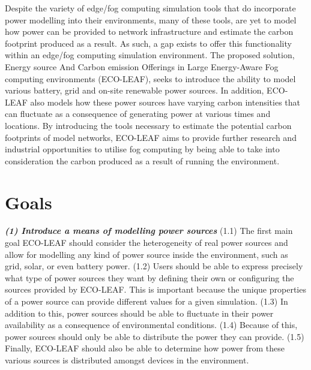 \documentclass{l4proj}
\begin{document}
Despite the variety of edge/fog computing simulation tools that do incorporate power modelling into their environments, many of these tools, are yet to model how power can be provided to network infrastructure and estimate the carbon footprint produced as a result.
As such, a gap exists to offer this functionality within an edge/fog computing simulation environment.
The proposed solution, Energy source And Carbon emission Offerings in Large Energy-Aware Fog computing environments (ECO-LEAF), seeks to introduce the ability to model various battery, grid and on-site renewable power sources.
In addition, ECO-LEAF also models how these power sources have varying carbon intensities that can fluctuate as a consequence of generating power at various times and locations.
By introducing the tools necessary to estimate the potential carbon footprints of model networks, ECO-LEAF aims to provide further research and industrial opportunities to utilise fog computing by being able to take into consideration the carbon produced as a result of running the environment.


\section{Goals}\label{intro:subsec:goals}
\textbf{\textit{(1) Introduce a means of modelling power sources}}
(1.1)\label{goal1.1} The first main goal ECO-LEAF should consider the heterogeneity of real power sources and allow for modelling any kind of power source inside the environment, such as grid, solar, or even battery power.
(1.2)\label{goal1.2} Users should be able to express precisely what type of power sources they want by defining their own or configuring the sources provided by ECO-LEAF.
This is important because the unique properties of a power source can provide different values for a given simulation.
(1.3)\label{goal1.3} In addition to this, power sources should be able to fluctuate in their power availability as a consequence of environmental conditions.
(1.4)\label{goal1.4} Because of this, power sources should only be able to distribute the power they can provide.
(1.5)\label{goal1.5} Finally, ECO-LEAF should also be able to determine how power from these various sources is distributed amongst devices in the environment.
\end{document}
